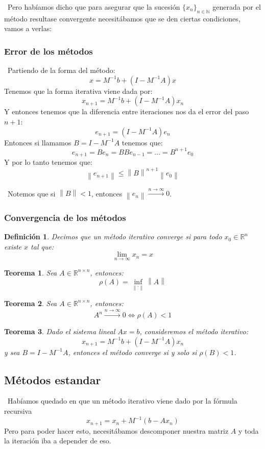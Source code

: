 \documentclass[12pt, oneside]{book}
\newtheorem*{definition}{Definición}
\newtheorem*{theorem}{Teorema}
\newcommand{\norm}[1]{\left\lVert#1\right\rVert}
\begin{document}
\ Pero habíamos dicho que para asegurar que la sucesión $\{x_n\}_{n \in \mathbb{N}}$ generada por el método resultase convergente necesitábamos que se den ciertas condiciones, vamos a verlas:

\subsubsection{Error de los métodos}
\ Partiendo de la forma del método: $$x=M^{-1}b+(I-M^{-1}A)x$$ Tenemos que la forma iterativa viene dada por: $$x_{n+1}=M^{-1}b+(I-M^{-1}A)x_n$$ Y entonces tenemos que la diferencia entre iteraciones nos da el error del paso $n+1$: $$e_{n+1}=(I-M^{-1}A)e_n$$ Entonces si llamamos $B=I-M^{-1}A$ tenemos que: $$e_{n+1}=Be_n=BBe_{n-1}=\dots=B^{n+1}e_0$$ Y por lo tanto tenemos que: $$\norm{e_{n+1}} \leq \norm{B}^{n+1}\norm{e_0}$$

\ Notemos que si $\norm{B}<1$, entonces $\norm{e_n}\xrightarrow{n \xrightarrow{} \infty}0$.

\subsubsection{Convergencia de los métodos}
\begin{definition}
	Decimos que un método iterativo converge si para todo $x_0 \in \mathbb{R}^n$ existe $x$ tal que: $$\lim_{n \to \infty}x_n=x$$
\end{definition}

\begin{theorem}
	Sea $A \in \mathbb{R}^{n\times n}$, entonces: $$\rho(A)=\inf_{\norm{\cdot}}\norm{A}$$
\end{theorem}

\begin{theorem}
	Sea $A \in \mathbb{R}^{n\times n}$, entonces: $$A^n \xrightarrow{n \xrightarrow{} \infty}0 \iff \rho(A)<1$$ 
\end{theorem}

\begin{theorem}
	Dado el sistema lineal $Ax=b$, consideremos el método iterativo: $$x_{n+1}=M^{-1}b+(I-M^{-1}A)x_n$$ y sea $B=I-M^{-1}A$, entonces el método converge si y solo si $\rho(B)<1$.
\end{theorem}

\subsection{Métodos estandar}
\ Habíamos quedado en que un método iterativo viene dado por la fórmula recursiva $$x_{n+1}=x_n+M^{-1}(b-Ax_n)$$ Pero para poder hacer esto, necesitábamos descomponer nuestra matriz $A$ y toda la iteración iba a depender de eso.
\end{document}
